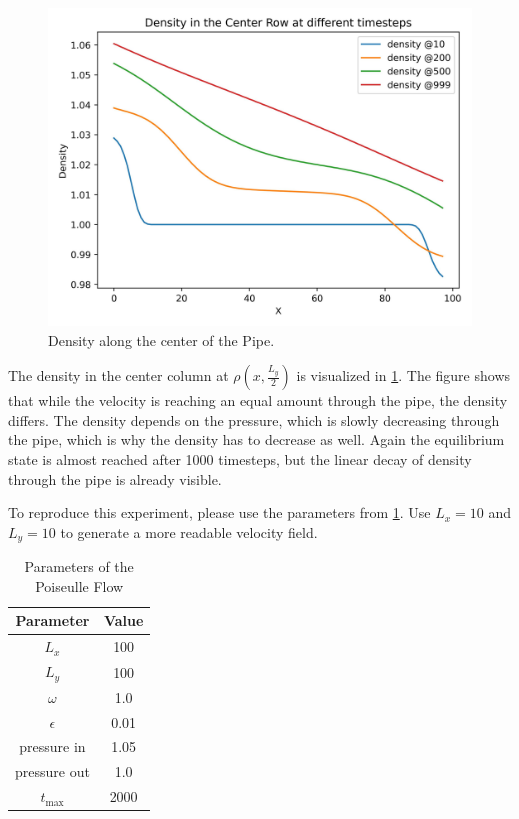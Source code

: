 \begin{figure}[H]
    \begin{center}
        \includegraphics[width=0.5\linewidth]{graphs/PoiseuilleFlow/density_at_column_x}
        \caption{Density along the center of the Pipe.}
        \label{fig:pf-density}
    \end{center}
\end{figure}

The density in the center column at $\rho\left( x, \frac{L_y}{2} \right)$ is visualized in \cref{fig:pf-density}.
The figure shows that while the velocity is reaching an equal amount through the pipe, the density differs.
The density depends on the pressure, which is slowly decreasing through the pipe, which is why the density has to decrease as well.
Again the equilibrium state is almost reached after 1000 timesteps, but the linear decay of density through the pipe is already visible.
\newline

To reproduce this experiment, please use the parameters from \cref{tab:pf-parameters}.
Use $L_x = 10$ and $L_y = 10$ to generate a more readable velocity field.

\begin{table}[H]
    \centering %
    \begin{tabular}{c c}
        \hline\hline %
        Parameter    & Value \\ [0.5ex] %
        \hline %
        $L_x$        & 100   \\
        $L_y$        & 100   \\
        $\omega$     & 1.0   \\
        $\epsilon$   & 0.01  \\
        pressure in  & 1.05  \\
        pressure out & 1.0   \\
        $t_{\max}$   & 2000  \\ [1ex] %
        \hline %
    \end{tabular}
    \caption{Parameters of the Poiseulle Flow} %
    \label{tab:pf-parameters}
\end{table}


